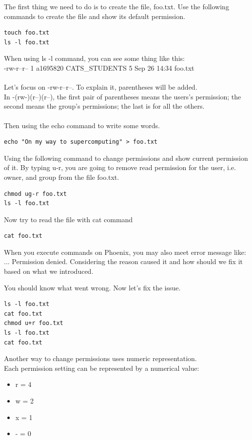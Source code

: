 \begin{steps}
The first thing we need to do is to create the file, foo.txt.
Use the following commands to create the file and show its default permission.
\begin{lstlisting}
touch foo.txt
ls -l foo.txt
\end{lstlisting}
When using ls -l command, you can see some thing like this: \\
-rw-r--r-- 1 a1695820 CATS\_STUDENTS 5 Sep 26 14:34 foo.txt\\
\\
Let's focus on -rw-r--r--. To explain it, parentheses will be added.\\ In -(rw-)(r--)(r--), the first pair of parentheses means the users's permission; the second means the group's permissions; the last is for all the others.\\
\\
Then using the echo command to write some words.
\begin{lstlisting}
echo "On my way to supercomputing" > foo.txt
\end{lstlisting}
Using the following command to change permissions and show current permission of it. By typing u-r, you are going to remove read permission for the user, i.e. owner, and group from the file foo.txt.
\begin{lstlisting}
chmod ug-r foo.txt
ls -l foo.txt
\end{lstlisting}
Now try to read the file with cat command
\begin{lstlisting}
cat foo.txt
\end{lstlisting}
\end{steps}

\begin{information}
When you execute commands on Phoenix, you may also meet error message like: ... Permission denied. Considering the reason caused it and how should we fix it based on what we introduced.
\end{information}

\begin{steps}
You should know what went wrong. Now let's fix the issue.
\begin{lstlisting}
ls -l foo.txt
cat foo.txt
chmod u+r foo.txt
ls -l foo.txt
cat foo.txt
\end{lstlisting}
\end{steps}

Another way to change permissions uses numeric representation.\\
Each permission setting can be represented by a numerical value:
\begin{itemize}
\item r = 4
\item w = 2
\item x = 1
\item - = 0
\end{itemize}

